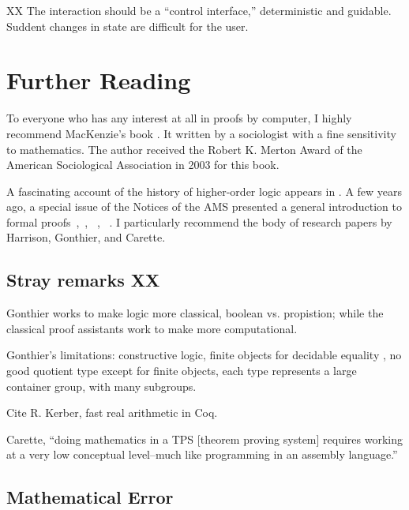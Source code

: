 \documentclass{llncs}
\begin{document}
XX The interaction should be a ``control interface,'' deterministic and guidable.
Suddent changes in state are difficult for the user.



\section{Further Reading}

To everyone who has any interest at all in proofs by computer, I
highly recommend MacKenzie's book \cite{Mac}.  It written by a
sociologist with a fine sensitivity to mathematics.  The author
received the Robert K. Merton Award of the American Sociological
Association in 2003 for this book.

A fascinating account of the history of higher-order logic appears in
\cite{Gor}.  A few years ago, a special issue of the Notices of the
AMS presented a general introduction to formal
proofs~\cite{Hales:2008:formal},~\cite{Harrison:2008:formal},
~\cite{gonthier:2008:formal}, ~\cite{Wiedijk:2008:formal}.  I particularly
recommend the body of research papers by Harrison, Gonthier, and
Carette.


\subsection{Stray remarks XX}

Gonthier works to make logic more classical, boolean vs. propistion;
while the classical proof assistants work to make more computational.

Gonthier's limitations: constructive logic, finite objects for
decidable equality , no good quotient type except for finite objects,
each type represents a large container group, with many subgroups.

Cite R. Kerber, fast real arithmetic in Coq.

Carette, ``doing mathematics in a TPS [theorem proving system]
requires working at a very low
conceptual level--much like programming in an assembly language.''



\subsection{Mathematical Error}
\end{document}
